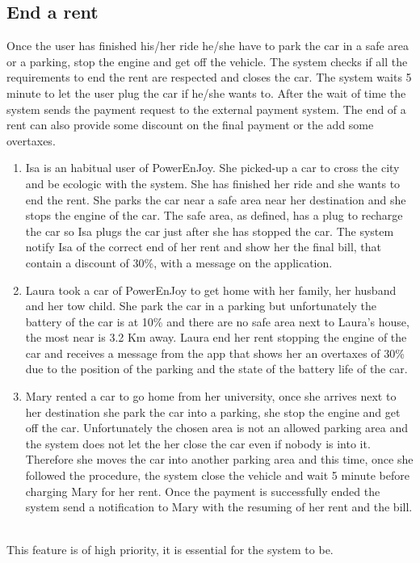 \subsection{End a rent}
Once the user has finished his/her ride he/she have to park the car in a safe area or a parking, stop the engine and get off the vehicle. The system checks if all the requirements to end the rent are respected and closes the car. The system waits 5 minute to let the user plug the car if he/she wants to. After the wait of time the system sends the payment request to the external payment system. The end of a rent can also provide some discount on the final payment or the add some overtaxes.
 \ \\
\begin{enumerate}
	\item Isa is an habitual user of PowerEnJoy. She picked-up a car to cross the city and be ecologic with the system. She has finished her ride and she wants to end the rent. She parks the car near a safe area near her destination and she stops the engine of the car. The safe area, as defined, has a plug to recharge the car so Isa plugs the car just after she has stopped the car. The system notify Isa of the correct end of her rent and show her the final bill, that contain a discount of 30\%, with a message on the application.
	\item Laura took a car of PowerEnJoy to get home with her family, her husband and her tow child. She park the car in a parking but unfortunately the battery of the car is at 10\% and there are no safe area next to Laura's house, the most near is 3.2 Km away. Laura end her rent stopping the engine of the car and receives a message from the app that shows her an overtaxes of 30\% due to the position of the parking and the state of the battery life of the car.
	\item Mary rented a car to go home from her university, once she arrives next to her destination she park the car into a parking, she stop the engine and get off the car. Unfortunately the chosen area is not an allowed parking area and the system does not let the her close the car even if nobody is into it. Therefore she moves the car into another parking area and this time, once she followed the procedure, the system close the vehicle and wait 5 minute before charging Mary for her rent. Once the payment is successfully ended the system send a notification to Mary with the resuming of her rent and the bill.
\end{enumerate}
 \ \\
This feature is of high priority, it is essential for the system to be.
